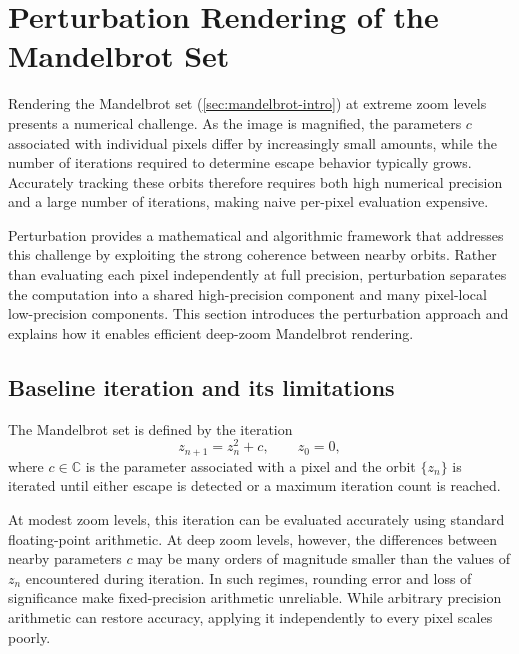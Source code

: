 \section{Perturbation Rendering of the Mandelbrot Set}
\label{sec:perturbation-concept}

Rendering the Mandelbrot set (\cref{sec:mandelbrot-intro}) at extreme zoom levels presents a
numerical challenge. As the image is magnified, the parameters \(c\) associated
with individual pixels differ by increasingly small amounts, while the number
of iterations required to determine escape behavior typically grows. Accurately
tracking these orbits therefore requires both high numerical precision and a
large number of iterations, making naive per-pixel evaluation
expensive.

Perturbation provides a mathematical and algorithmic framework
\cite{Martin2013Perturbation,HeilandAllen2013Perturbation,Wikibooks_Perturbation}
that addresses
this challenge by exploiting the strong coherence between nearby orbits. Rather
than evaluating each pixel independently at full precision, perturbation
separates the computation into a shared high-precision component and many
pixel-local low-precision components. This section introduces the perturbation
approach and explains how it enables efficient deep-zoom Mandelbrot rendering.

\subsection{Baseline iteration and its limitations}

The Mandelbrot set is defined by the iteration
\begin{equation}
z_{n+1} = z_n^2 + c, \qquad z_0 = 0,
\label{eq:mandelbrot-iter}
\end{equation}
where \(c \in \mathbb{C}\) is the parameter associated with a pixel and the orbit
\(\{z_n\}\) is iterated until either escape is detected or a maximum iteration
count is reached.

At modest zoom levels, this iteration can be evaluated accurately using standard
floating-point arithmetic. At deep zoom levels, however, the differences between
nearby parameters \(c\) may be many orders of magnitude smaller than the values
of \(z_n\) encountered during iteration. In such regimes, rounding error and
loss of significance make fixed-precision arithmetic unreliable. While arbitrary
precision arithmetic can restore accuracy, applying it independently to every
pixel scales poorly.


